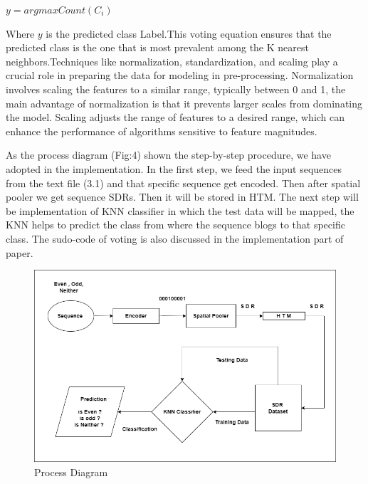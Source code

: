 \documentclass[conference]{IEEEtran}
\begin{document}
\begin{math} y = argmax Count(C_i) 
\end{math}


Where \begin{math} y\end{math} is the predicted class Label.This voting equation ensures that the predicted class is the one that is most prevalent among the K nearest neighbors.Techniques like normalization, standardization, and scaling play a crucial role in preparing the data for modeling in pre-processing. Normalization involves scaling the features to a similar range, typically between 0 and 1, the main advantage of normalization is that it prevents larger scales from dominating the model. Scaling adjusts the range of features to a desired range, which can enhance the performance of algorithms sensitive to feature magnitudes.

As the process diagram (Fig:4) shown the step-by-step procedure, we have adopted in the implementation. In the first step, we feed the input sequences from the text file (3.1) and that specific sequence get encoded. Then after spatial pooler we get sequence SDRs. Then it will be stored in HTM. The next step will be implementation of KNN classifier in which the test data will be mapped, the KNN helps to predict the class from where the sequence blogs to that specific class. The sudo-code of voting is also discussed in the implementation part of paper. 





\begin{figure}
    \centering
    \includegraphics[width=1.0\linewidth]{Process Diagram.png}
    \caption{Process Diagram}
    \label{fig:enter-label}
\end{figure}
\end{document}
